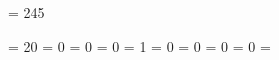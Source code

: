 %
%
%
%
%




\chardef \zfirstinsert = 245


 =  20            %
 =   0            %
 =   0            %
 =   0            %
 =   1            %
 =   0            %
 =   0            %
 =   0            %
 =   0            %
 = \zfirstinsert  %



\def \definecount #1#2{%
  \zalloc{\count}{10}{\zfirstinsert}{\countdef}{#1}%
  #1 = #2}

\def \definedimen #1#2{%
  \zalloc{\dimen}{11}{\zfirstinsert}{\dimendef}{#1}%
  #1 = #2}

\def \defineskip #1#2{%
  \zalloc{\skip}{12}{\zfirstinsert}{\skipdef}{#1}%
  #1 = #2}

\def \definemuskip #1#2{%
  \zalloc{\muskip}{13}{255}{\muskipdef}{#1}%
  #1 = #2}

\def \definebox #1{%
  \zalloc{\box}{14}{\zfirstinsert}{\chardef}{#1}}

\def \definetoks #1{%
  \zalloc{\toks}{15}{256}{\toksdef}{#1}%
  #1 = {}}

